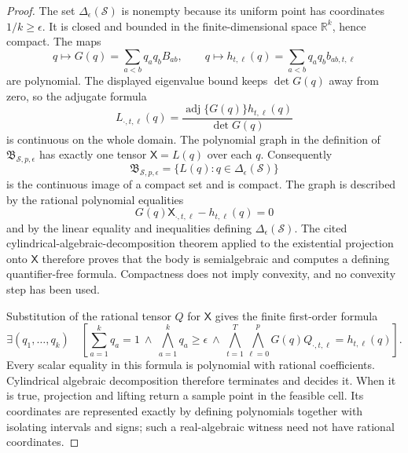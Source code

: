 \documentclass{article}
\begin{document}
\begin{proof}
The set \(\Delta_{\epsilon}(\mathcal S)\) is nonempty because its uniform point has coordinates \(1/k\geq\epsilon\).  It is closed and bounded in the finite-dimensional space \(\mathbb R^k\), hence compact.  The maps
\[
 q\longmapsto G(q)=\sum_{a<b}q_aq_bB_{ab},
 \qquad
 q\longmapsto h_{t,\ell}(q)=\sum_{a<b}q_aq_bb_{ab,t,\ell}
\]
are polynomial.  The displayed eigenvalue bound keeps \(\det G(q)\) away from zero, so the adjugate formula
\[
 L_{\cdot,t,\ell}(q)
 =\frac{\operatorname{adj}\{G(q)\}h_{t,\ell}(q)}{\det G(q)}
\]
is continuous on the whole domain.  The polynomial graph in the definition of \(\mathfrak B_{\mathcal S,p,\epsilon}\) has exactly one tensor \(\mathsf X=L(q)\) over each \(q\).  Consequently
\[
 \mathfrak B_{\mathcal S,p,\epsilon}
 =\{L(q):q\in\Delta_{\epsilon}(\mathcal S)\}
\]
is the continuous image of a compact set and is compact.  The graph is described by the rational polynomial equalities
\[
 G(q)\mathsf X_{\cdot,t,\ell}-h_{t,\ell}(q)=0
\]
and by the linear equality and inequalities defining \(\Delta_{\epsilon}(\mathcal S)\).  The cited cylindrical-algebraic-decomposition theorem applied to the existential projection onto \(\mathsf X\) therefore proves that the body is semialgebraic and computes a defining quantifier-free formula.  Compactness does not imply convexity, and no convexity step has been used.

Substitution of the rational tensor \(Q\) for \(\mathsf X\) gives the finite first-order formula
\[
 \exists(q_1,\ldots,q_k)\quad
 \left[
   \sum_{a=1}^kq_a=1
   \ \wedge\ 
   \bigwedge_{a=1}^k q_a\geq\epsilon
   \ \wedge\ 
   \bigwedge_{t=1}^T\bigwedge_{\ell=0}^p
   G(q)Q_{\cdot,t,\ell}=h_{t,\ell}(q)
 \right].
\]
Every scalar equality in this formula is polynomial with rational coefficients.  Cylindrical algebraic decomposition therefore terminates and decides it.  When it is true, projection and lifting return a sample point in the feasible cell.  Its coordinates are represented exactly by defining polynomials together with isolating intervals and signs; such a real-algebraic witness need not have rational coordinates.


\end{proof}
\end{document}
